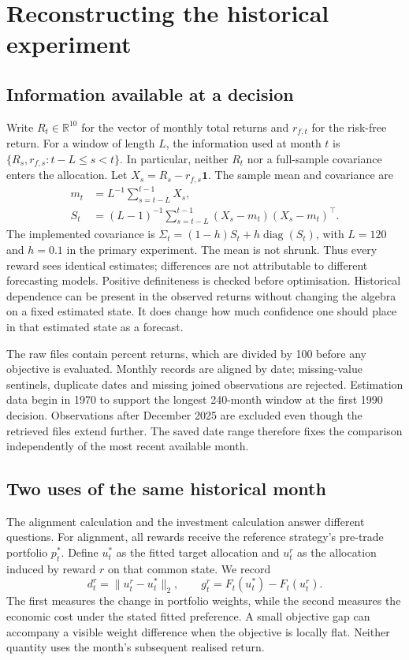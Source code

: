 \documentclass[sigconf,review]{acmart}
\begin{document}
\section{Reconstructing the historical experiment}
\subsection{Information available at a decision}
Write $R_t\in\mathbb R^{10}$ for the vector of monthly total returns and $r_{f,t}$ for the risk-free return. For a window of length $L$, the information used at month $t$ is $\{R_s,r_{f,s}:t-L\le s<t\}$. In particular, neither $R_t$ nor a full-sample covariance enters the allocation. Let $X_s=R_s-r_{f,s}\mathbf1$. The sample mean and covariance are
\begin{align}
 m_t&=L^{-1}\sum_{s=t-L}^{t-1}X_s,\\
 S_t&=(L-1)^{-1}\sum_{s=t-L}^{t-1}(X_s-m_t)(X_s-m_t)^\top.
\end{align}
The implemented covariance is $\Sigma_t=(1-h)S_t+h\operatorname{diag}(S_t)$, with $L=120$ and $h=0.1$ in the primary experiment. The mean is not shrunk. Thus every reward sees identical estimates; differences are not attributable to different forecasting models. Positive definiteness is checked before optimisation. Historical dependence can be present in the observed returns without changing the algebra on a fixed estimated state. It does change how much confidence one should place in that estimated state as a forecast.

The raw files contain percent returns, which are divided by 100 before any objective is evaluated. Monthly records are aligned by date; missing-value sentinels, duplicate dates and missing joined observations are rejected. Estimation data begin in 1970 to support the longest 240-month window at the first 1990 decision. Observations after December 2025 are excluded even though the retrieved files extend further. The saved date range therefore fixes the comparison independently of the most recent available month.

\subsection{Two uses of the same historical month}
The alignment calculation and the investment calculation answer different questions. For alignment, all rewards receive the reference strategy's pre-trade portfolio $p_t^*$. Define $u_t^*$ as the fitted target allocation and $u_t^r$ as the allocation induced by reward $r$ on that common state. We record
\begin{equation}
 d_t^r=\|u_t^r-u_t^*\|_2,\qquad
 g_t^r=F_t(u_t^*)-F_t(u_t^r).
\end{equation}
The first measures the change in portfolio weights, while the second measures the economic cost under the stated fitted preference. A small objective gap can accompany a visible weight difference when the objective is locally flat. Neither quantity uses the month's subsequent realised return.
\end{document}
